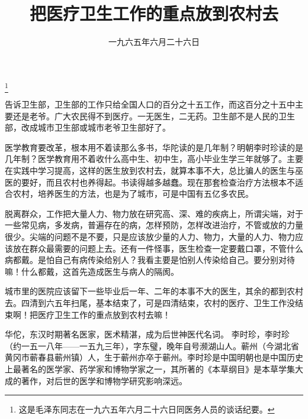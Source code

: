 
\title{把医疗卫生工作的重点放到农村去}
\date{一九六五年六月二十六日}
\thanks{这是毛泽东同志在一九六五年六月二十六日同医务人员的谈话纪要。}
\maketitle


告诉卫生部，卫生部的工作只给全国人口的百分之十五工作，而这百分之十五中主要还是老爷。广大农民得不到医疗。一无医生，二无药。卫生部不是人民的卫生部，改成城市卫生部或城市老爷卫生部好了。

医学教育要改革，根本用不着读那么多书，华陀读的是几年制？明朝李时珍读的是几年制？医学教育用不着收什么高中生、初中生，高小毕业生学三年就够了。主要在实践中学习提高，这样的医生放到农村去，就算本事不大，总比骗人的医生与巫医的要好，而且农村也养得起。书读得越多越蠢。现在那套检查治疗方法根本不适合农村，培养医生的方法，也是为了城市，可是中国有五亿多农民。

脱离群众，工作把大量人力、物力放在研究高、深、难的疾病上，所谓尖端，对于一些常见病，多发病，普遍存在的病，怎样预防，怎样改进治疗，不管或放的力量很少。尖端的问题不是不要，只是应该放少量的人力、物力，大量的人力、物力应该放在群众最需要的问题上去。还有一件怪事，医生检查一定要戴口罩，不管什么病都戴。是怕自己有病传染给别人？我看主要是怕别人传染给自己。要分别对待嘛！什么都戴，这首先造成医生与病人的隔阂。

城市里的医院应该留下一些毕业后一年、二年的本事不大的医生，其余的都到农村去。四清到六五年扫尾，基本结束了，可是四清结束，农村的医疗、卫生工作没结束啊！把医疗卫生工作的重点放到农村去嘛！

\begin{maonote}
华佗，东汉时期著名医家，医术精湛，成为后世神医代名词。
李时珍，李时珍（约一五一八年——一五九三年），字东璧，晚年自号濒湖山人。蕲州（今湖北省黄冈市蕲春县蕲州镇）人，生于蕲州亦卒于蕲州。李时珍是中国明朝也是中国历史上最著名的医学家、药学家和博物学家之一，其所著的《本草纲目》是本草学集大成的著作，对后世的医学和博物学研究影响深远。
\end{maonote}
